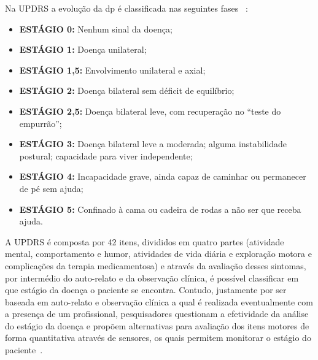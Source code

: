 Na UPDRS a evolução da \ac{dp} é classificada nas seguintes fases ~\cite{updrs87}:
  \begin{itemize}
    \item \textbf{ESTÁGIO 0:} Nenhum sinal da doença;
    \item \textbf{ESTÁGIO 1:} Doença unilateral;
    \item \textbf{ESTÁGIO 1,5:} Envolvimento unilateral e axial;
    \item \textbf{ESTÁGIO 2:} Doença bilateral sem déficit de equilíbrio;
    \item \textbf{ESTÁGIO 2,5:} Doença bilateral leve, com recuperação no “teste do empurrão”;
    \item \textbf{ESTÁGIO 3:} Doença bilateral leve a moderada; alguma instabilidade postural; capacidade para viver independente;
    \item \textbf{ESTÁGIO 4:} Incapacidade grave, ainda capaz de caminhar ou permanecer de pé sem ajuda;
    \item \textbf{ESTÁGIO 5:} Confinado à cama ou cadeira de rodas a não ser que receba ajuda.
  \end{itemize}

A UPDRS é composta por 42 itens, divididos em quatro partes (atividade mental, comportamento e humor, atividades de vida diária e exploração motora e complicações da terapia medicamentosa) e através da avaliação desses sintomas, por intermédio do auto-relato e da observação clínica, é possível classificar em que estágio da doença o paciente se encontra. Contudo, justamente por ser baseada em auto-relato e observação clínica a qual é realizada eventualmente com a presença de um profissional, pesquisadores questionam a efetividade da análise do estágio da doença e propõem alternativas para avaliação dos itens motores de forma quantitativa através de sensores, os quais permitem monitorar o estágio do paciente~\cite{kostek12,synnott_wiipd_2012,patel_monitoring_2009}.

